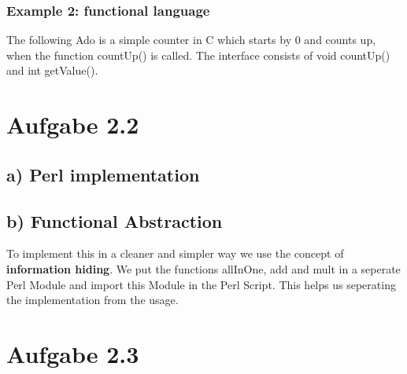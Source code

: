 \documentclass[a4paper,10pt]{scrartcl}[2003/01/01]
\begin{document}
\subsubsection*{Example 2: functional language}
The following Ado is a simple counter in C which starts by 0 and counts up, when the function countUp() is called. The interface consists of void countUp() and int getValue().



\section*{Aufgabe 2.2}
\subsection*{a) Perl implementation}


\subsection*{b) Functional Abstraction}
To implement this in a cleaner and simpler way we use the concept of \textbf{information hiding}. We put the functions allInOne, add and mult in a seperate Perl Module and import this Module in the Perl Script. This helps us seperating the implementation from the usage.





\section*{Aufgabe 2.3}
\end{document}
